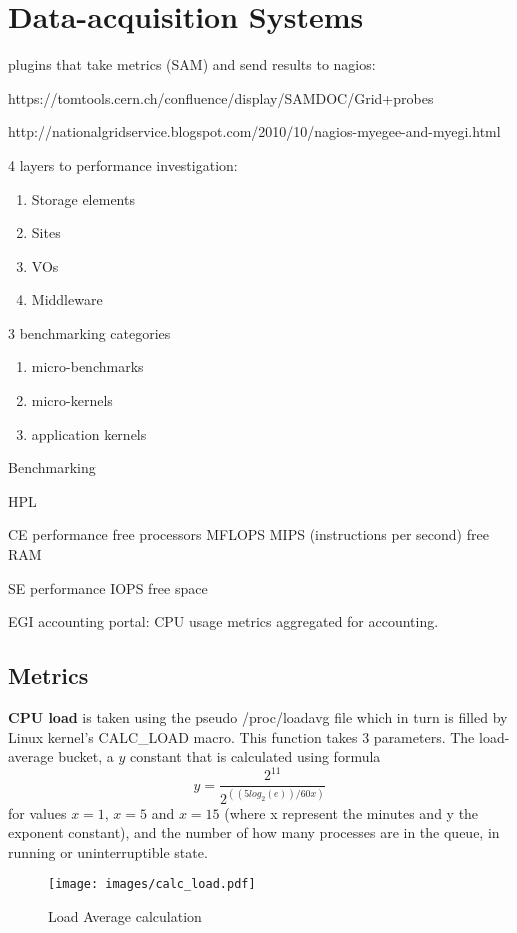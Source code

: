 \section{Data-acquisition Systems}
plugins that take metrics (SAM) and send results to nagios:

https://tomtools.cern.ch/confluence/display/SAMDOC/Grid+probes

http://nationalgridservice.blogspot.com/2010/10/nagios-myegee-and-myegi.html

4 layers to performance investigation:
\begin{enumerate}
  \item Storage elements
  \item Sites
  \item VOs
  \item Middleware
\end{enumerate}
3 benchmarking categories
\begin{enumerate}
  \item micro-benchmarks
  \item micro-kernels
  \item application kernels
\end{enumerate}
Benchmarking

HPL
\cite{gridbench}

CE performance
free processors
MFLOPS
MIPS (instructions per second)
free RAM

SE performance
IOPS
free space

EGI accounting portal: CPU usage metrics aggregated for accounting.
\newpage

\subsection{Metrics}

{\bf CPU load} is taken using the pseudo /proc/loadavg file which in turn is
filled by Linux kernel's CALC\_LOAD macro. This function takes 3 parameters.
The load-average bucket, a $y$ constant that is calculated using formula
\[
y=\frac{2^{11}}{2^{((5log_2(e))/60x)}}
\]
for values $x=1$, $x=5$ and $x=15$ (where x represent the minutes and y the
exponent constant), and the number of how many processes are in the queue, in
running or uninterruptible state.

\begin{figure}[htb]
\centering
 \texttt{[image: images/calc\_load.pdf]}
\caption{Load Average calculation}
\label{figure:calc_load}
\end{figure}

